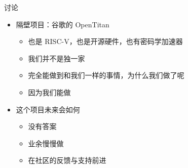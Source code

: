 \documentclass[aspectratio=169]{ctexbeamer}
\begin{document}
\begin{frame}{讨论}
  \begin{itemize}
    \item 隔壁项目：谷歌的 OpenTitan\begin{itemize}
      \item 也是 RISC-V，也是开源硬件，也有密码学加速器
      \item 我们并不是独一家
      \item 完全能做到和我们一样的事情，为什么我们做了呢
      \item 因为我们能做
    \end{itemize}
    \item 这个项目未来会如何\begin{itemize}
      \item 没有答案
      \item 业余慢慢做
      \item 在社区的反馈与支持前进
    \end{itemize}
  \end{itemize}
\end{frame}
\end{document}
